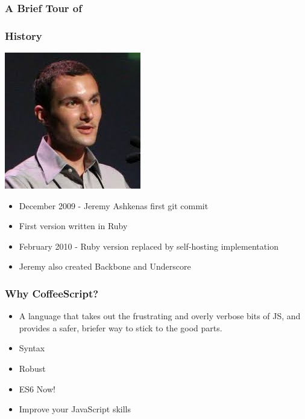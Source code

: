 \documentclass{beamer}
\begin{document}
\begin{frame}
  \frametitle{A Brief Tour of}


\end{frame}

\begin{frame}
  \frametitle{History}
  \includegraphics[scale=.60]{jeremy}  
  \begin{itemize}
    \item December 2009 - Jeremy Ashkenas first git commit
      \pause
    \item First version written in Ruby
      \pause
    \item February 2010 - Ruby version replaced by self-hosting
      implementation
      \pause
    \item Jeremy also created Backbone and Underscore
  \end{itemize}  
\end{frame}

\begin{frame}
  \frametitle{Why CoffeeScript?}
  \begin{itemize}
    \pause
    \item A language that takes out the frustrating and overly verbose bits of JS, and provides a safer, briefer way to stick to the good parts.
    \pause
    \item Syntax
    \pause
    \item Robust
    \pause
    \item ES6 Now!
    \pause
    \item Improve your JavaScript skills
  \end{itemize}
\end{frame}
\end{document}
